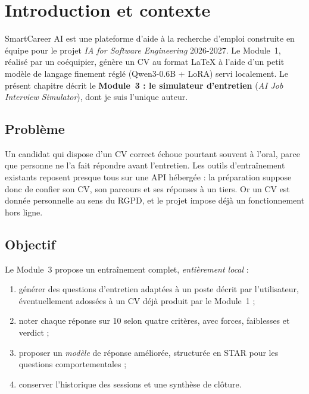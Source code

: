 \section{Introduction et contexte}

SmartCareer AI est une plateforme d'aide à la recherche d'emploi construite en
équipe pour le projet \emph{IA for Software Engineering} 2026-2027. Le
Module~1, réalisé par un coéquipier, génère un CV au format \LaTeX{} à l'aide
d'un petit modèle de langage finement réglé (Qwen3-0.6B + LoRA) servi
localement. Le présent chapitre décrit le \textbf{Module~3 : le simulateur
d'entretien} (\emph{AI Job Interview Simulator}), dont je suis l'unique auteur.

\subsection{Problème}

Un candidat qui dispose d'un CV correct échoue pourtant souvent à l'oral, parce
que personne ne l'a fait répondre avant l'entretien. Les outils d'entraînement
existants reposent presque tous sur une API hébergée : la préparation suppose
donc de confier son CV, son parcours et ses réponses à un tiers. Or un CV est
donnée personnelle au sens du RGPD, et le projet impose déjà un fonctionnement
hors ligne.

\subsection{Objectif}

Le Module~3 propose un entraînement complet, \emph{entièrement local} :

\begin{enumerate}[leftmargin=1.6em,itemsep=1pt,topsep=2pt]
  \item générer des questions d'entretien adaptées à un poste décrit par
        l'utilisateur, éventuellement adossées à un CV déjà produit par le
        Module~1 ;
  \item noter chaque réponse sur 10 selon quatre critères, avec forces,
        faiblesses et verdict ;
  \item proposer un \emph{modèle} de réponse améliorée, structurée en STAR pour
        les questions comportementales ;
  \item conserver l'historique des sessions et une synthèse de clôture.
  \end{enumerate}

